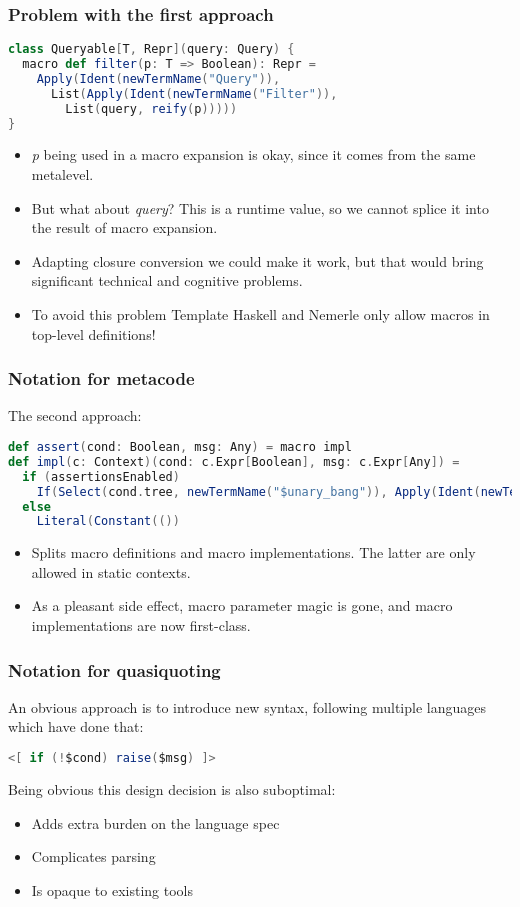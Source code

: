 \documentclass[hyperref={bookmarks=false}]{beamer}
\begin{document}
\begin{frame}[fragile]
\frametitle{Problem with the first approach}
\begin{lstlisting}[language=scala]
class Queryable[T, Repr](query: Query) {
  macro def filter(p: T => Boolean): Repr =
    Apply(Ident(newTermName("Query")),
      List(Apply(Ident(newTermName("Filter")),
        List(query, reify(p)))))
}
\end{lstlisting}

\begin{itemize}
\item \emph{p} being used in a macro expansion is okay, since it comes from the same metalevel.
\item But what about \emph{query}? This is a runtime value, so we cannot splice it into the result of macro expansion.
\item Adapting closure conversion we could make it work, but that would bring significant technical and cognitive problems.
\item To avoid this problem Template Haskell and Nemerle only allow macros in top-level definitions!
\end{itemize}
\end{frame}

\begin{frame}[fragile]
\frametitle{Notation for metacode}

The second approach:
\begin{lstlisting}[language=scala]
def assert(cond: Boolean, msg: Any) = macro impl
def impl(c: Context)(cond: c.Expr[Boolean], msg: c.Expr[Any]) =
  if (assertionsEnabled)
    If(Select(cond.tree, newTermName("$unary_bang")), Apply(Ident(newTermName("raise")), List(msg.tree)), Literal(Constant(())))
  else
    Literal(Constant(())
\end{lstlisting}

\begin{itemize}
\item Splits macro definitions and macro implementations. The latter are only allowed in static contexts.
\item As a pleasant side effect, macro parameter magic is gone, and macro implementations are now first-class.
\end{itemize}
\end{frame}

\begin{frame}[fragile]
\frametitle{Notation for quasiquoting}

An obvious approach is to introduce new syntax, following multiple languages which have done that:

\begin{lstlisting}[language=scala]
<[ if (!$cond) raise($msg) ]>
\end{lstlisting}

Being obvious this design decision is also suboptimal:
\begin{itemize}
\item Adds extra burden on the language spec
\item Complicates parsing
\item Is opaque to existing tools
\end{itemize}
\end{frame}
\end{document}
